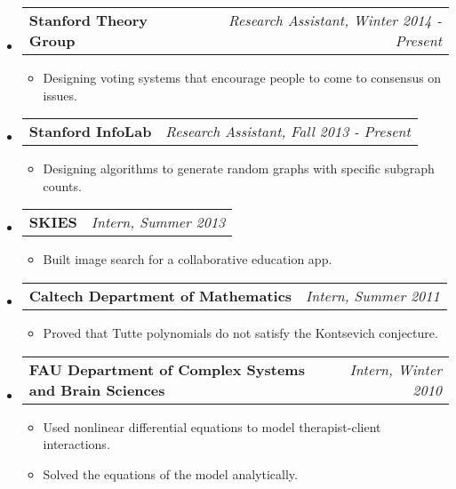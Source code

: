 \documentclass[letterpaper,11pt]{article}
\makeatletter
\newcommand{\resitem}[1]{\item #1 \vspace{-2pt}}
\newcommand{\ressubheading}[4]{
\begin{tabular*}{7.0in}{l@{\extracolsep{\fill}}r}
		\textbf{#1} & \textit{#4} \\
\end{tabular*}\vspace{-6pt}}
\makeatother
\begin{document}
\begin{itemize}
\item
	\ressubheading{Stanford Theory Group}{Stanford, CA}{Research Assistant}{Research Assistant, Winter 2014 - Present}
	\begin{itemize}
		\resitem{Designing voting systems that encourage people to come to consensus on issues.}
	\end{itemize}
\item
	\ressubheading{Stanford InfoLab}{Stanford, CA}{Research Assistant}{Research Assistant, Fall 2013 - Present}
	\begin{itemize}
		\resitem{Designing algorithms to generate random graphs with specific subgraph counts.}
	\end{itemize}

\item
	\ressubheading{SKIES}{Pasadena, CA}{Intern}{Intern, Summer 2013}
	\begin{itemize}
		\resitem{Built image search for a collaborative education app.}
	\end{itemize}


\item
	\ressubheading{Caltech Department of Mathematics}{Pasadena, CA}{Summer Undergraduate Research Fellow}{Intern, Summer 2011}
	\begin{itemize}
		\resitem{Proved that Tutte polynomials do not satisfy the Kontsevich conjecture.}
	\end{itemize}

\item
	\ressubheading{FAU Department of Complex Systems and Brain Sciences}{Boca Raton, FL}{Research Intern}{Intern, Winter 2010}
	\begin{itemize}
		\resitem{Used nonlinear differential equations to model therapist-client interactions.}
		\resitem{Solved the equations of the model analytically.}
	\end{itemize}


\end{itemize}
\end{document}
